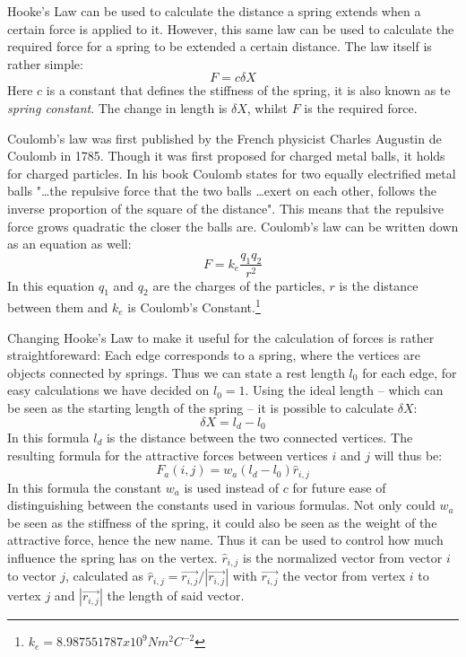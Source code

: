 \documentclass[a4paper,12pt]{article}
\begin{document}
    Hooke's Law can be used to calculate the distance a spring extends when a certain force is applied to it.
    However, this same law can be used to calculate the required force for a spring to be extended a certain distance.
    The law itself is rather simple:
    \begin{equation}
      F = c \delta X
    \end{equation}
    Here $c$ is a constant that defines the stiffness of the spring, it is also known as te \emph{spring constant}.
    The change in length is $\delta X$, whilst $F$ is the required force.

    Coulomb's law was first published by the French physicist Charles Augustin de Coulomb in 1785.\cite{coulomb1785premier}
    Though it was first proposed for charged metal balls, it holds for charged particles.
    In his book Coulomb states for two equally electrified metal balls "\ldots the repulsive force that the two balls \ldots exert on each other, follows the inverse proportion of the square of the distance".
    This means that the repulsive force grows quadratic the closer the balls are.
    Coulomb's law can be written down as an equation as well:
    \begin{equation}
      F = k_e \frac{q_1 q_2}{r^2}
    \end{equation}
     In this equation $q_1$ and $q_2$ are the charges of the particles, $r$ is the distance between them and $k_e$ is Coulomb's Constant.\footnote{$k_e = 8.987551787 x 10^9 N m^2 C^{-2}$}

    Changing Hooke's Law to make it useful for the calculation of forces is rather straightforeward:
    Each edge corresponds to a spring, where the vertices are objects connected by springs.
    Thus we can state a rest length $l_0$ for each edge, for easy calculations we have decided on $l_0 = 1$.
    Using the ideal length -- which can be seen as the starting length of the spring -- it is possible to calculate $\delta X$:
    \begin{equation}
      \delta X =  l_d - l_0
    \end{equation}
    In this formula $l_d$ is the distance between the two connected vertices.
    The resulting formula for the attractive forces between vertices $i$ and $j$ will thus be:
    \begin{equation}
      F_a (i,j) = w_{a} (l_d - l_0) \hat{r}_{i,j}
    \end{equation}
    In this formula the constant $w_{a}$ is used instead of $c$ for future ease of distinguishing between the constants used in various formulas.
    Not only could $w_{a}$ be seen as the stiffness of the spring, it could also be seen as the weight of the attractive force, hence the new name.
    Thus it can be used to control how much influence the spring has on the vertex. $\hat{r}_{i,j}$ is the normalized vector from vector $i$ to vector $j$, calculated as $\hat{r}_{i,j} = \vec{r_{i,j}} / |\vec{r_{i,j}}|$ with $\vec{r_{i,j}}$ the vector from vertex $i$ to vertex $j$ and $|\vec{r_{i,j}}|$ the length of said vector.
\end{document}
